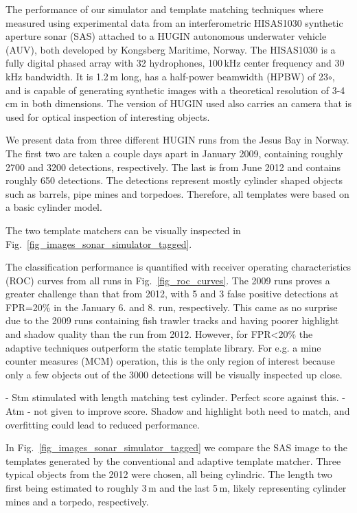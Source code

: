 \documentclass[10pt,journal,draftclsnofoot,onecolumn]{IEEEtran}
\newcommand\Fig[1]{Fig.~\ref{#1}}
\newcommand\1{\vec 1}
\begin{document}
\newlength\imgspacing\setlength\imgspacing{.5cm}
\setcounter{topnumber}{2}

The performance of our simulator and template matching techniques where measured using experimental data from an interferometric HISAS1030 synthetic aperture sonar (SAS) attached to a HUGIN autonomous underwater vehicle (AUV), both developed by Kongsberg Maritime, Norway. The HISAS1030 is a fully digital phased array with 32 hydrophones, 100\,kHz center frequency and 30\,kHz bandwidth. It is 1.2\,m long, has a half-power beamwidth (HPBW) of 23$\circ$, and is capable of generating synthetic images with a theoretical resolution of 3-4\,cm in both dimensions. The version of HUGIN used also carries an camera that is used for optical inspection of interesting objects.

We present data from three different HUGIN runs from the Jesus Bay in Norway. The first two are taken a couple days apart in January 2009, containing roughly 2700 and 3200 detections, respectively. The last is from June 2012 and contains roughly 650 detections. The detections represent mostly cylinder shaped objects such as barrels, pipe mines and torpedoes. Therefore, all templates were based on a basic cylinder model.




The two template matchers can be visually inspected in \Fig{fig_images_sonar_simulator_tagged}. 

The classification performance is quantified with receiver operating characteristics (ROC) curves from all runs in \Fig{fig_roc_curves}. The 2009 runs proves a greater challenge than that from 2012, with 5 and 3 false positive detections at FPR=20\% in the January 6. and 8. run, respectively. This came as no surprise due to the 2009 runs containing fish trawler tracks and having poorer highlight and shadow quality than the run from 2012. However, for FPR<20\% the adaptive techniques outperform the static template library. For e.g. a mine counter measures (MCM) operation, this is the only region of interest because only a few objects out of the 3000 detections will be visually inspected up close.

- Stm stimulated with length matching test cylinder. Perfect score against this.
- Atm - not given to improve score. Shadow and highlight both need to match, and overfitting could lead to reduced performance.

In \Fig{fig_images_sonar_simulator_tagged} we compare the SAS image to the templates generated by the conventional and adaptive template matcher. Three typical objects from the 2012 were chosen, all being cylindric. The length two first being estimated to roughly 3\,m and the last 5\,m, likely representing cylinder mines and a torpedo, respectively. 
\end{document}

